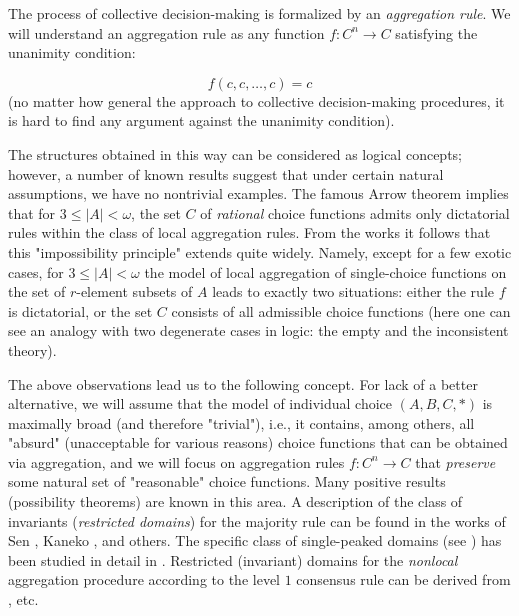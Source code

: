 \documentclass[graybox]{SNmult}
\theoremstyle{definition}
\begin{document}
The process of collective decision-making is formalized by an \textit{aggregation rule}. We will understand an aggregation rule as any function $f: C^n\to C$ satisfying the unanimity condition:

$$
f(  c,   c, \ldots,   c)=  c
$$
(no matter how general the approach to collective decision-making procedures, it is hard to find any argument against the unanimity condition).

\par The structures obtained in this way can be considered as logical concepts; however, a number of known results suggest that under certain natural assumptions, we have no nontrivial examples. The famous Arrow theorem \cite{Arrow} implies that for $3\leq |A|<\omega$, the set $C$ of \textit{rational} choice functions admits only dictatorial rules within the class of local aggregation rules. From the works \cite{Shelah, Polyakov1} it follows that this "impossibility principle" extends quite widely. Namely, except for a few exotic cases, for $3\leq |A|<\omega$ the model of local aggregation of single-choice functions on the set of $r$-element subsets of $A$ leads to exactly two situations: either the rule $f$ is dictatorial, or the set $C$ consists of all admissible choice functions (here one can see an analogy with two degenerate cases in logic: the empty and the inconsistent theory).

\par The above observations lead us to the following concept. For lack of a better alternative, we will assume that the model of individual choice $(A, B, C, \ast)$ is maximally broad (and therefore "trivial"), i.e., it contains, among others, all "absurd" (unacceptable for various reasons) choice functions that can be obtained via aggregation, and we will focus on aggregation rules $f: C^n\to C$ that \textit{preserve} some natural set of "reasonable" choice functions. Many positive results (possibility theorems) are known in this area. A description of the class of invariants (\textit{restricted domains}) for the majority rule can be found in the works of Sen \cite{Sen}, Kaneko \cite{Kaneko}, and others. The specific class of single-peaked domains (see \cite{Mulin}) has been studied in detail in \cite{Karpov1, Karpov2, Karpov3}. Restricted (invariant) domains for the \textit{nonlocal} aggregation procedure according to the level $1$ consensus rule can be derived from \cite{level 1}, etc.
\end{document}
